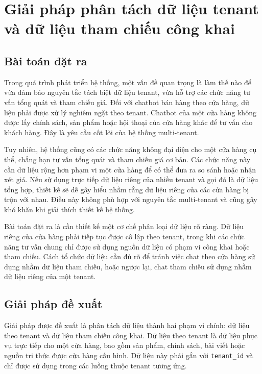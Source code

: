 \documentclass[../DoAn.tex]{subfiles}
\begin{document}
\section{Giải pháp phân tách dữ liệu tenant và dữ liệu tham chiếu công khai}
\label{section:5.2}

\subsection{Bài toán đặt ra}
\label{subsection:5.2.1}

Trong quá trình phát triển hệ thống, một vấn đề quan trọng là làm thế nào để vừa đảm bảo nguyên tắc tách biệt dữ liệu tenant, vừa hỗ trợ các chức năng tư vấn tổng quát và tham chiếu giá. Đối với chatbot bán hàng theo cửa hàng, dữ liệu phải được xử lý nghiêm ngặt theo tenant. Chatbot của một cửa hàng không được lấy chính sách, sản phẩm hoặc hội thoại của cửa hàng khác để tư vấn cho khách hàng. Đây là yêu cầu cốt lõi của hệ thống multi-tenant.

Tuy nhiên, hệ thống cũng có các chức năng không đại diện cho một cửa hàng cụ thể, chẳng hạn tư vấn tổng quát và tham chiếu giá cơ bản. Các chức năng này cần dữ liệu rộng hơn phạm vi một cửa hàng để có thể đưa ra so sánh hoặc nhận xét giá. Nếu sử dụng trực tiếp dữ liệu riêng của nhiều tenant và gọi đó là dữ liệu tổng hợp, thiết kế sẽ dễ gây hiểu nhầm rằng dữ liệu riêng của các cửa hàng bị trộn với nhau. Điều này không phù hợp với nguyên tắc multi-tenant và cũng gây khó khăn khi giải thích thiết kế hệ thống.

Bài toán đặt ra là cần thiết kế một cơ chế phân loại dữ liệu rõ ràng. Dữ liệu riêng của cửa hàng phải tiếp tục được cô lập theo tenant, trong khi các chức năng tư vấn chung chỉ được sử dụng nguồn dữ liệu có phạm vi công khai hoặc tham chiếu. Cách tổ chức dữ liệu cần đủ rõ để tránh việc chat theo cửa hàng sử dụng nhầm dữ liệu tham chiếu, hoặc ngược lại, chat tham chiếu sử dụng nhầm dữ liệu riêng của một tenant.

\subsection{Giải pháp đề xuất}
\label{subsection:5.2.2}

Giải pháp được đề xuất là phân tách dữ liệu thành hai phạm vi chính: dữ liệu theo tenant và dữ liệu tham chiếu công khai. Dữ liệu theo tenant là dữ liệu phục vụ trực tiếp cho một cửa hàng, bao gồm sản phẩm, chính sách, bài viết hoặc nguồn tri thức được cửa hàng cấu hình. Dữ liệu này phải gắn với \texttt{tenant\_id} và chỉ được sử dụng trong các luồng thuộc tenant tương ứng.
\end{document}
